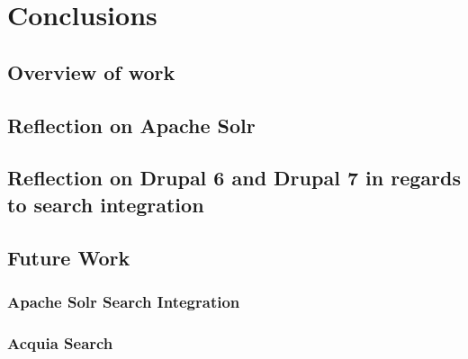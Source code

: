 \chapter{Conclusions}
\section{Overview of work}
\section{Reflection on Apache Solr}
\section{Reflection on Drupal 6 and Drupal 7 in regards to search integration}
\section{Future Work}
\subsection{Apache Solr Search Integration}
\subsection{Acquia Search}